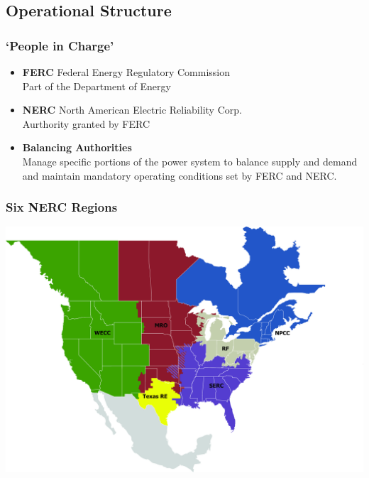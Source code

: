 \documentclass[14pt, unknownkeysallowed]{beamer}
\begin{document}
\subsection{Operational Structure}
\begin{frame}
\frametitle{`People in Charge'}
\begin{itemize}
\item \textbf{FERC}{ \footnotesize Federal Energy Regulatory Commission}\\
 Part of the Department of Energy
\item \textbf{NERC}{ \footnotesize
 North American Electric Reliability Corp.}\\
 Aurthority granted by FERC
 \item \textbf{Balancing Authorities} \\
 Manage specific portions of the power system to balance supply and demand and maintain mandatory operating conditions set by FERC and NERC. %
\end{itemize}
\end{frame}
\begin{frame}
\frametitle{Six NERC Regions} %
{\centering
\includegraphics[height=.8\textheight]{NERCregions} %
}
\end{frame}
\end{document}
